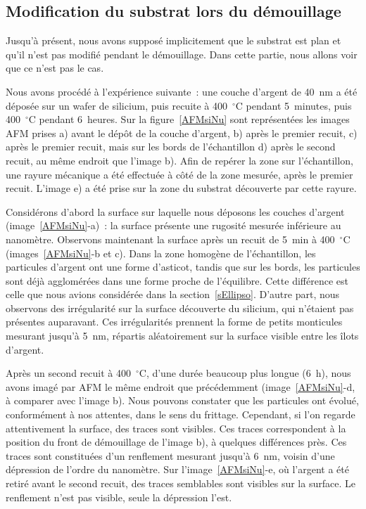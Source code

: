 \subsection{Modification du substrat lors du démouillage}
\label{sModifSubstrat}
Jusqu'à présent, nous avons supposé implicitement que le substrat est plan et qu'il n'est pas modifié pendant le démouillage. Dans cette partie, nous allons voir que ce n’est pas le cas.\par
Nous avons procédé à l'expérience suivante~: une couche d'argent de 40~nm a été déposée sur un wafer de silicium, puis recuite à 400~$^\circ$C pendant 5~minutes, puis 400~$^\circ$C pendant 6~heures. Sur la figure~\ref{AFMsiNu} sont représentées les images AFM prises a) avant le dépôt de la couche d'argent, b) après le premier recuit, c) après le premier recuit, mais sur les bords de l'échantillon d) après le second recuit, au même endroit que l'image b). Afin de repérer la zone sur l'échantillon, une rayure mécanique a été effectuée à côté de la zone mesurée, après le premier recuit. L'image e) a été prise sur la zone du substrat découverte par cette rayure.\par
Considérons d'abord la surface sur laquelle nous déposons les couches d'argent (image~\ref{AFMsiNu}-a)~: la surface présente une rugosité mesurée inférieure au nanomètre. Observons maintenant la surface après un recuit de 5~min à 400~$^\circ$C (images~\ref{AFMsiNu}-b et c). Dans la zone homogène de l'échantillon, les particules d'argent ont une forme d'asticot, tandis que sur les bords, les particules sont déjà agglomérées dans une forme proche de l'équilibre. Cette différence est celle que nous avions considérée dans la section~\ref{sEllipso}. D'autre part, nous observons des irrégularité sur la surface découverte du silicium, qui n'étaient pas présentes auparavant. Ces irrégularités prennent la forme de petits monticules mesurant jusqu'à 5~nm, répartis aléatoirement sur la surface visible entre les îlots d'argent.\par
Après un second recuit à 400~$^\circ$C, d'une durée beaucoup plus longue (6~h), nous avons imagé par AFM le même endroit que précédemment (image~\ref{AFMsiNu}-d, à comparer avec l'image b). Nous pouvons constater que les particules ont évolué, conformément à nos attentes, dans le sens du frittage. Cependant, si l'on regarde attentivement la surface, des traces sont visibles. Ces traces correspondent à la position du front de démouillage de l'image b), à quelques différences près. Ces traces sont constituées d'un renflement mesurant jusqu'à 6~nm, voisin d'une dépression de l'ordre du nanomètre. Sur l'image~\ref{AFMsiNu}-e, où l'argent a été retiré avant le second recuit, des traces semblables sont visibles sur la surface. Le renflement n'est pas visible, seule la dépression l'est.\par 

